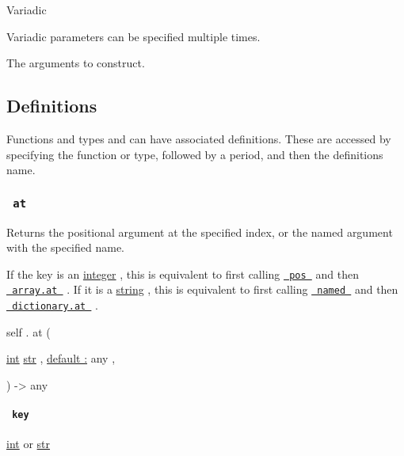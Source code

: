 {{ Variadic }}

\label{constructor-arguments-variadic-tooltip}
Variadic parameters can be specified multiple times.

The arguments to construct.

\subsection{\texorpdfstring{{ Definitions
}}{ Definitions }}\label{definitions}

\label{definitions-tooltip}
Functions and types and can have associated definitions. These are
accessed by specifying the function or type, followed by a period, and
then the definition\textquotesingle s name.

\subsubsection{\texorpdfstring{\texttt{\ at\ }}{ at }}\label{definitions-at}

Returns the positional argument at the specified index, or the named
argument with the specified name.

If the key is an \href{/docs/reference/foundations/int/}{integer} , this
is equivalent to first calling
\href{/docs/reference/foundations/arguments/\#definitions-pos}{\texttt{\ pos\ }}
and then
\href{/docs/reference/foundations/array/\#definitions-at}{\texttt{\ array.at\ }}
. If it is a \href{/docs/reference/foundations/str/}{string} , this is
equivalent to first calling
\href{/docs/reference/foundations/arguments/\#definitions-named}{\texttt{\ named\ }}
and then
\href{/docs/reference/foundations/dictionary/\#definitions-at}{\texttt{\ dictionary.at\ }}
.

self { . } { at } (

{ \href{/docs/reference/foundations/int/}{int}
\href{/docs/reference/foundations/str/}{str} , } {
\hyperref[definitions-at-parameters-default]{default :} { any } , }

) -\textgreater{} { any }

\paragraph{\texorpdfstring{\texttt{\ key\ }}{ key }}\label{definitions-at-key}

\href{/docs/reference/foundations/int/}{int} {or}
\href{/docs/reference/foundations/str/}{str}

